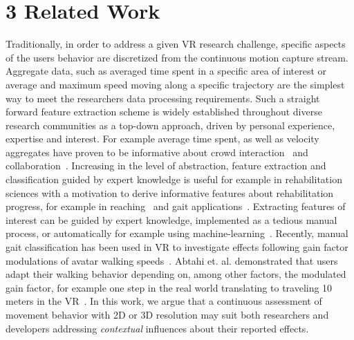 \section{3 Related Work}
Traditionally, in order to address a given VR research challenge, specific aspects of the users behavior are discretized from the continuous motion capture stream. Aggregate data, such as averaged time spent in a specific area of interest or average and maximum speed moving along a specific trajectory are the simplest way to meet the researchers data processing requirements. Such a straight forward feature extraction scheme is widely established throughout diverse research communities as a top-down approach, driven by personal experience, expertise and interest. For example average time spent, as well as velocity aggregates have proven to be informative about crowd interaction~\cite{Nelson2019} and collaboration~\cite{Rios2018}. Increasing in the level of abstraction, feature extraction and classification guided by expert knowledge is useful for example in rehabilitation sciences with a motivation to derive informative features about rehabilitation progress, for example in reaching~\cite{DeLosReyes-Guzman2014} and gait applications~\cite{Taborri2016}. Extracting features of interest can be guided by expert knowledge, implemented as a tedious manual process, or automatically for example using  machine-learning~\cite{Butepage2017}. Recently, manual gait classification has been used in VR to investigate effects following gain factor modulations of avatar walking speeds~\cite{Abtahi2019}. Abtahi et. al. demonstrated that users adapt their walking behavior depending on, among other factors, the modulated gain factor, for example one step in the real world translating to traveling 10 meters in the VR~\cite{Abtahi2019}. In this work, we argue that a continuous assessment of movement behavior with 2D or 3D resolution may suit both researchers and developers addressing \textit{contextual} influences about their reported effects.

